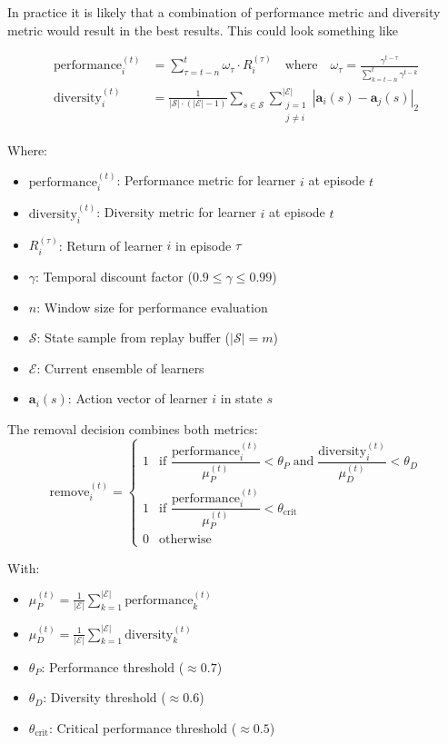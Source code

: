 \documentclass[12pt]{article}
\begin{document}
In practice it is likely that a combination of performance metric and diversity metric would result in the best results. This could look something like


\begin{align*}
    \text{performance}_i^{(t)} &= \sum_{\tau=t-n}^{t} \omega_\tau \cdot R_i^{(\tau)} 
    \quad \text{where} \quad 
    \omega_\tau = \frac{\gamma^{t-\tau}}{\sum_{k=t-n}^{t} \gamma^{t-k}} \\
    \text{diversity}_i^{(t)} &= \frac{1}{|\mathcal{S}| \cdot (|\mathcal{E}|-1)} 
    \sum_{s \in \mathcal{S}} \sum_{\substack{j=1 \\ j \neq i}}^{|\mathcal{E}|} 
    \left| \bm{a}_i(s) - \bm{a}_j(s) \right|_2
\end{align*}


Where:
\begin{itemize}
    \item $\text{performance}_i^{(t)}$: Performance metric for learner $i$ at episode $t$
    \item $\text{diversity}_i^{(t)}$: Diversity metric for learner $i$ at episode $t$
    \item $R_i^{(\tau)}$: Return of learner $i$ in episode $\tau$
    \item $\gamma$: Temporal discount factor ($0.9 \leq \gamma \leq 0.99$)
    \item $n$: Window size for performance evaluation
    \item $\mathcal{S}$: State sample from replay buffer ($|\mathcal{S}| = m$)
    \item $\mathcal{E}$: Current ensemble of learners
    \item $\bm{a}_i(s)$: Action vector of learner $i$ in state $s$
\end{itemize}

The removal decision combines both metrics:
\begin{equation*}
    \text{remove}_i^{(t)} = 
    \begin{cases} 
        1 & \text{if } \dfrac{\text{performance}_i^{(t)}}{\mu_P^{(t)}} < \theta_P 
        \;\text{and}\; \dfrac{\text{diversity}_i^{(t)}}{\mu_D^{(t)}} < \theta_D \\
        1 & \text{if } \dfrac{\text{performance}_i^{(t)}}{\mu_P^{(t)}} < \theta_{\text{crit}} \\
        0 & \text{otherwise}
    \end{cases}
\end{equation*}

With:
\begin{itemize}
    \item $\mu_P^{(t)} = \frac{1}{|\mathcal{E}|} \sum_{k=1}^{|\mathcal{E}|} \text{performance}_k^{(t)}$
    \item $\mu_D^{(t)} = \frac{1}{|\mathcal{E}|} \sum_{k=1}^{|\mathcal{E}|} \text{diversity}_k^{(t)}$
    \item $\theta_P$: Performance threshold ($\approx 0.7$)
    \item $\theta_D$: Diversity threshold ($\approx 0.6$)
    \item $\theta_{\text{crit}}$: Critical performance threshold ($\approx 0.5$)
\end{itemize}
\end{document}
